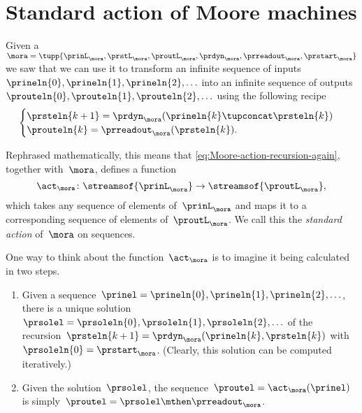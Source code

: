 
\section{Standard action of Moore machines}
\label{sec:Moore-acting-on-sequences}

Given a ~$\mora = \tupp{\prinL_\mora,\prstL_\mora,\proutL_\mora,\prdyn_\mora,\prreadout_\mora,\prstart_\mora}$
we saw that we can use it to transform an infinite sequence of inputs~$\prineln{0}, \prineln{1}, \prineln{2}, \ldots$ into an infinite sequence of outputs~$\prouteln{0}, \prouteln{1}, \prouteln{2}, \ldots$ using the following recipe
\begin{equation}
    \label{eq:Moore-action-recursion-again}
    \begin{cases}
        \prsteln{k+1} = \prdyn_\mora(\prineln{k} \tupconcat \prsteln{k}) \\
        \prouteln{k} = \prreadout_\mora(\prsteln{k}).
    \end{cases}
\end{equation}

Rephrased mathematically, this means that \cref{eq:Moore-action-recursion-again}, together with~$\mora$, defines a function
\begin{equation}\label{eq:a-moore-acting-on-streams}
    \act_{\mora} \colon \streamsof{\prinL_\mora}  \to \streamsof{\proutL_\mora},
\end{equation}
which takes any sequence of elements of~$\prinL_\mora$ and maps it to a corresponding sequence of elements of~$\proutL_\mora$.
We call this the \emph{standard action} of~$\mora$ on sequences.

\begin{remark}
    \label{re:moore-action-two-steps}
    One way to think about the function~$\act_{\mora}$ is to imagine it being calculated in two steps.
    \begin{enumerate}
        \item Given a sequence~$\prinel = \prineln{0}, \prineln{1}, \prineln{2}, \ldots$, there is a unique solution~$\prsolel = \prsoleln{0}, \prsoleln{1}, \prsoleln{2}, \ldots$ of the recursion~$\prsteln{k+1} = \prdyn_\mora(\prineln{k}, \prsteln{k})$ with~$\prsoleln{0} = \prstart_\mora$.
              (Clearly, this solution can be computed iteratively.)
        \item Given the solution~$\prsolel$, the sequence~$\proutel = \act_{\mora}(\prinel)$ is simply~$\proutel = \prsolel \mthen \prreadout_\mora$.
    \end{enumerate}
\end{remark}

